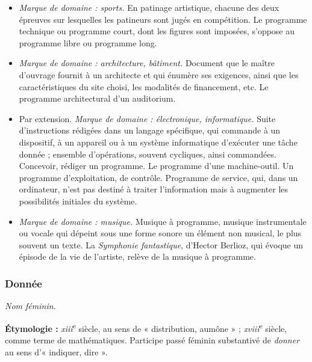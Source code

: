 \begin{graybox}
\begin{enumerate}
\begin{itemize}
            \item \textit{Marque de domaine : sports.} En patinage artistique,
            chacune des deux épreuves sur lesquelles les patineurs sont jugés
            en compétition. Le programme technique ou programme court, dont
            les figures sont imposées, s'oppose au programme libre ou programme
            long.

            \item \textit{Marque de domaine : architecture, bâtiment.}
            Document que le maître d'ouvrage fournit à un architecte et qui
            énumère ses exigences, ainsi que les caractéristiques du site
            choisi, les modalités de financement, etc. Le programme
            architectural d'un auditorium.

            \item Par extension. \textit{Marque de domaine : électronique,
            informatique.} Suite d'instructions rédigées dans un langage
            spécifique, qui commande à un dispositif, à un appareil ou à un
            système informatique d'exécuter une tâche donnée ; ensemble
            d'opérations, souvent cycliques, ainsi commandées. Concevoir,
            rédiger un programme. Le programme d'une machine-outil. Un
            programme d'exploitation, de contrôle. Programme de service, qui,
            dans un ordinateur, n'est pas destiné à traiter l'information mais
            à augmenter les possibilités initiales du système.

            \item \textit{Marque de domaine : musique.} Musique à programme,
            musique instrumentale ou vocale qui dépeint sous une forme sonore
            un élément non musical, le plus souvent un texte. La
            \textit{Symphonie fantastique}, d'Hector Berlioz, qui évoque un
            épisode de la vie de l'artiste, relève de la musique à programme.
        \end{itemize}
    \end{enumerate}

    \subsubsection{Donnée}

    \textit{Nom féminin.} \parencite{acfr_donnee}

    \textbf{Étymologie :} \textit{xiii}\textsuperscript{e} siècle, au sens de
    « distribution, aumône » ; \textit{xviii}\textsuperscript{e} siècle, comme
    terme de mathématiques. Participe passé féminin substantivé de
    \textit{donner} au sens d'« indiquer, dire ».


\end{graybox}
